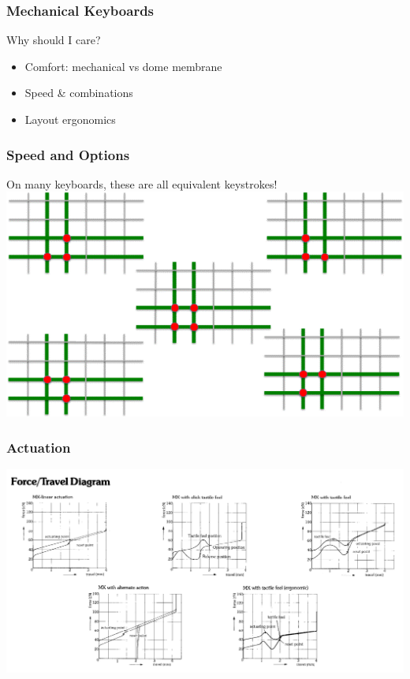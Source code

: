 \documentclass{beamer}
\begin{document}
\begin{frame}
  \frametitle{Mechanical Keyboards}
  Why should I care?
  \begin{itemize}
    \item Comfort: mechanical vs dome membrane
    \item Speed \& combinations
    \item Layout ergonomics
  \end{itemize}
\end{frame}

\begin{frame}
  \frametitle{Speed and Options}
  On many keyboards, these are all equivalent keystrokes!
  \includegraphics[scale=0.7]{images/multi-press}
\end{frame}

\begin{frame}
  \frametitle{Actuation}
  \includegraphics[scale=0.25]{images/force-travel-diagram}
\end{frame}

\end{document}

